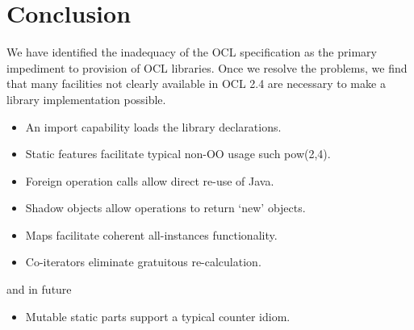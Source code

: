 \documentclass[sigconf]{acmart}
\begin{document}
\section{Conclusion}\label{Conclusion}

We have identified the inadequacy of the OCL specification as the primary impediment to provision of OCL libraries. Once we resolve the problems, we find that many facilities not clearly available in OCL 2.4 are necessary to make a library implementation possible.

\begin{itemize}
	\item An import capability loads the library declarations.
	\item Static features facilitate typical non-OO usage such pow(2,4).
	\item Foreign operation calls allow direct re-use of Java.
	\item Shadow objects allow operations to return `new' objects.
	\item Maps facilitate coherent all-instances functionality.
	\item Co-iterators eliminate gratuitous re-calculation.
\end{itemize}
and in future
\begin{itemize}
	\item Mutable static parts support a typical counter idiom.
\end{itemize}



\end{document}
